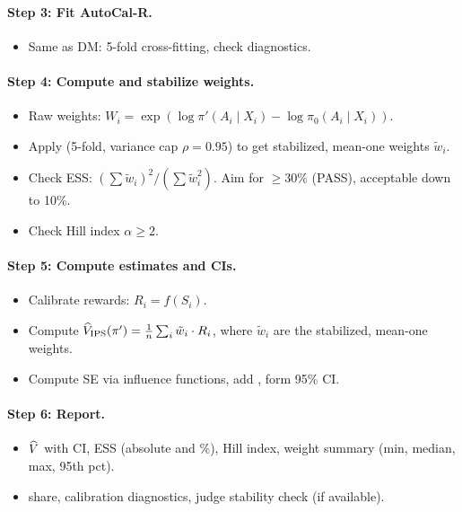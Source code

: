 \paragraph{Step 3: Fit AutoCal-R.}
\begin{itemize}
\item Same as DM: 5-fold cross-fitting, check diagnostics.
\end{itemize}

\paragraph{Step 4: Compute and stabilize weights.}
\begin{itemize}
\item Raw weights: $W_i = \exp(\log \pi'(A_i \mid X_i) - \log \pi_0(A_i \mid X_i))$.
\item Apply \simcal{} (5-fold, variance cap $\rho = 0.95$) to get stabilized, mean-one weights $\tilde{w}_i$.
\item Check ESS: $({\textstyle\sum} \tilde{w}_i)^2 / ({\textstyle\sum} \tilde{w}_i^2)$. Aim for $\ge 30\%$ (PASS), acceptable down to 10\%.
\item Check Hill index $\alpha \ge 2$.
\end{itemize}

\paragraph{Step 5: Compute estimates and CIs.}
\begin{itemize}
\item Calibrate rewards: $R_i = f(S_i)$.
\item Compute $\widehat{V}_{\text{IPS}}(\pi') = \frac{1}{n} \sum_i \tilde{w}_i \cdot R_i$, where $\tilde{w}_i$ are the stabilized, mean-one weights.
\item Compute SE via influence functions, add \oua, form 95\% CI.
\end{itemize}

\paragraph{Step 6: Report.}
\begin{itemize}
\item $\widehat{V}$ with CI, ESS (absolute and \%), Hill index, weight summary (min, median, max, 95th pct).
\item \oua{} share, calibration diagnostics, judge stability check (if available).
\end{itemize}

